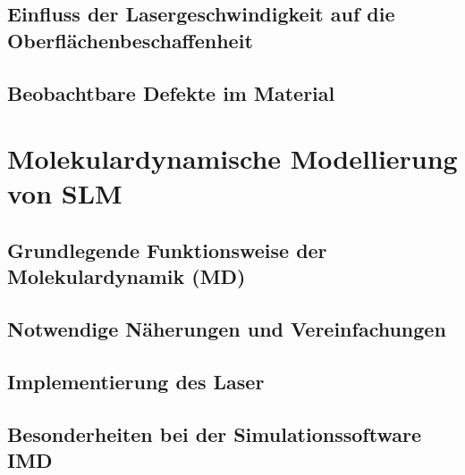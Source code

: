    \subsection{Einfluss der Lasergeschwindigkeit auf die Oberflächenbeschaffenheit}
    \subsection{Beobachtbare Defekte im Material}


\section{Molekulardynamische Modellierung von SLM}
    \subsection{Grundlegende Funktionsweise der Molekulardynamik (MD)}
    \subsection{Notwendige Näherungen und Vereinfachungen}
    \subsection{Implementierung des Laser}
    \subsection{Besonderheiten bei der Simulationssoftware IMD}